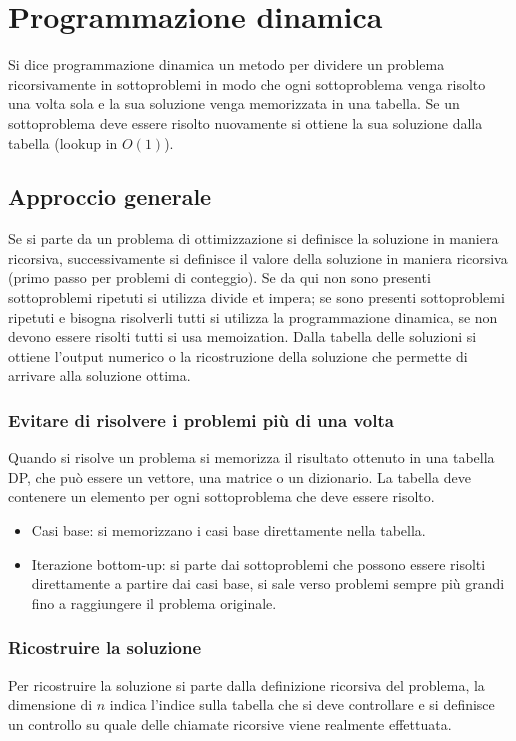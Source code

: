\chapter{Programmazione dinamica}
	Si dice programmazione dinamica un metodo per dividere un problema ricorsivamente in sottoproblemi in modo che ogni sottoproblema venga risolto una volta sola e la sua soluzione venga memorizzata in
	una tabella. Se un sottoproblema deve essere risolto nuovamente si ottiene la sua soluzione dalla tabella (lookup in $O(1)$).
\section{Approccio generale}
	Se si parte da un problema di ottimizzazione si definisce la soluzione in maniera ricorsiva, successivamente si definisce il valore della soluzione in maniera ricorsiva (primo passo per problemi di conteggio). Se da
	qui non sono presenti sottoproblemi ripetuti si utilizza divide et impera; se sono presenti sottoproblemi ripetuti e bisogna risolverli tutti si utilizza la programmazione dinamica, se non devono essere risolti tutti
	si usa memoization. Dalla tabella delle soluzioni si ottiene l'output numerico o la ricostruzione della soluzione che permette di arrivare alla soluzione ottima. 
	\subsection{Evitare di risolvere i problemi pi\`u di una volta}
		Quando si risolve un problema si memorizza il risultato ottenuto in una tabella DP, che pu\`o essere un vettore, una matrice o un dizionario. La tabella deve contenere un elemento per ogni sottoproblema che
		deve essere risolto.
		\begin{itemize}
		\item Casi base: si memorizzano i casi base direttamente nella tabella.
		\item Iterazione bottom-up: si parte dai sottoproblemi che possono essere risolti direttamente a partire dai casi base, si sale verso problemi sempre pi\`u grandi fino a raggiungere il problema originale. 
		\end{itemize} 
	\subsection{Ricostruire la soluzione}
		Per ricostruire la soluzione si parte dalla definizione ricorsiva del problema, la dimensione di $n$ indica l'indice sulla tabella che si deve controllare e si definisce un controllo su quale delle chiamate ricorsive 
		viene realmente effettuata.
